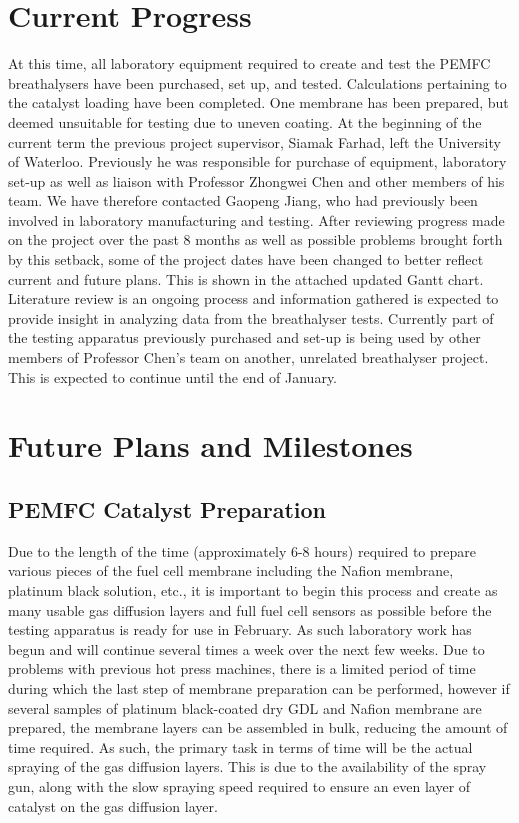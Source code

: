 \documentclass{article}
\begin{document}
	\section{Current Progress}
		At this time, all laboratory equipment required to create and test the PEMFC breathalysers have been purchased, set up, and tested. Calculations pertaining to the catalyst loading have been completed. One membrane has been prepared, but deemed unsuitable for testing due to uneven coating.
		At the beginning of the current term the previous project supervisor, Siamak Farhad, left the University of Waterloo. Previously he was responsible for purchase of equipment, laboratory set-up as well as liaison with Professor Zhongwei Chen and other members of his team. We have therefore contacted Gaopeng Jiang, who had previously been involved in laboratory manufacturing and testing. After reviewing progress made on the project over the past 8 months as well as possible problems brought forth by this setback, some of the project dates have been changed to better reflect current and future plans. This is shown in the attached updated Gantt chart. Literature review is an ongoing process and information gathered is expected to provide insight in analyzing data from the breathalyser tests.
		Currently part of the testing apparatus previously purchased and set-up is being used by other members of Professor Chen's team on another, unrelated breathalyser project. This is expected to continue until the end of January.
	\section{Future Plans and Milestones}
		\subsection{PEMFC Catalyst Preparation}
			Due to the length of the time (approximately 6-8 hours) required to prepare various pieces of the fuel cell membrane including the Nafion membrane, platinum black solution, etc., it is important to begin this process and create as many usable gas diffusion layers and full fuel cell sensors as possible before the testing apparatus is ready for use in February. As such laboratory work has begun and will continue several times a week over the next few weeks.
			Due to problems with previous hot press machines, there is a limited period of time during which the last step of membrane preparation can be performed, however if several samples of platinum black-coated dry GDL and Nafion membrane are prepared, the membrane layers can be assembled in bulk, reducing the amount of time required. As such, the primary task in terms of time will be the actual spraying of the gas diffusion layers. This is due to the availability of the spray gun, along with the slow spraying speed required to ensure an even layer of catalyst on the gas diffusion layer.
\end{document}

